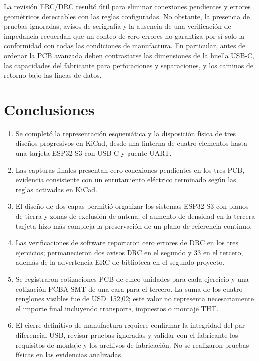\documentclass[journal,10pt]{IEEEtran}
\begin{document}
La revisión ERC/DRC resultó útil para eliminar conexiones pendientes y errores geométricos detectables con las reglas configuradas. No obstante, la presencia de pruebas ignoradas, avisos de serigrafía y la ausencia de una verificación de impedancia recuerdan que un conteo de cero errores no garantiza por sí solo la conformidad con todas las condiciones de manufactura. En particular, antes de ordenar la PCB avanzada deben contrastarse las dimensiones de la huella USB-C, las capacidades del fabricante para perforaciones y separaciones, y los caminos de retorno bajo las líneas de datos.

\section{Conclusiones}
\begin{enumerate}
\item Se completó la representación esquemática y la disposición física de tres diseños progresivos en KiCad, desde una linterna de cuatro elementos hasta una tarjeta ESP32-S3 con USB-C y puente UART.
\item Las capturas finales presentan cero conexiones pendientes en los tres PCB, evidencia consistente con un enrutamiento eléctrico terminado según las reglas activadas en KiCad.
\item El diseño de dos capas permitió organizar los sistemas ESP32-S3 con planos de tierra y zonas de exclusión de antena; el aumento de densidad en la tercera tarjeta hizo más compleja la preservación de un plano de referencia continuo.
\item Las verificaciones de software reportaron cero errores de DRC en los tres ejercicios; permanecieron dos avisos DRC en el segundo y 33 en el tercero, además de la advertencia ERC de biblioteca en el segundo proyecto.
\item Se registraron cotizaciones PCB de cinco unidades para cada ejercicio y una cotización PCBA SMT de una cara para el tercero. La suma de los cuatro renglones visibles fue de USD~152,02; este valor no representa necesariamente el importe final incluyendo transporte, impuestos o montaje THT.
\item El cierre definitivo de manufactura requiere confirmar la integridad del par diferencial USB, revisar pruebas ignoradas y validar con el fabricante los requisitos de montaje y los archivos de fabricación. No se realizaron pruebas físicas en las evidencias analizadas.
\end{enumerate}
\end{document}
